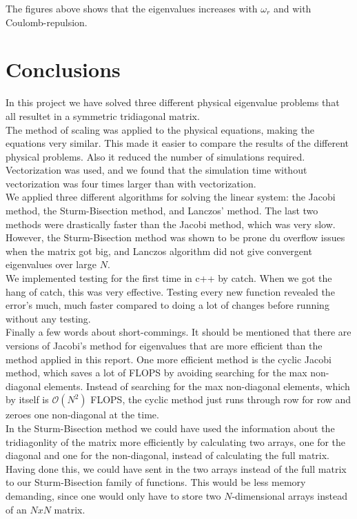 \documentclass{article}
\begin{document}
The figures above shows that the eigenvalues increases with $\omega_r$ and with Coulomb-repulsion.


\section{Conclusions}
In this project we have solved three different physical eigenvalue problems that all resultet in a symmetric tridiagonal matrix. \\

The method of scaling was applied to the physical equations, making the equations very similar. This made it easier to compare the results of the different physical problems. Also it reduced the number of simulations required. \\

Vectorization was used, and we found that the simulation time without vectorization was four times larger than with vectorization.\\

We applied three different algorithms for solving the linear system: the Jacobi method, the Sturm-Bisection method, and Lanczos' method. The last two methods were drastically faster than the Jacobi method, which was very slow. However, the Sturm-Bisection method was shown to be prone du overflow issues when the matrix got big, and Lanczos algorithm did not give convergent eigenvalues over large $N$. \\

We implemented testing for the first time in c++ by catch. When we got the hang of catch, this was very effective. Testing every new function revealed the error's much, much faster compared to doing a lot of changes before running without any testing.\\

Finally a few words about short-commings. It should be mentioned that there are versions of Jacobi's method for eigenvalues that are more efficient than the method applied in this report. One more efficient method is the cyclic Jacobi method, which saves a lot of FLOPS by avoiding searching for the max non-diagonal elements. Instead of searching for the max non-diagonal elements, which by itself is $\mathcal{O}(N^2)$ FLOPS, the cyclic method just runs through row for row and zeroes one non-diagonal at the time.\\

In the Sturm-Bisection method we could have used the information about the tridiagonlity of the matrix more efficiently by calculating two arrays, one for the diagonal and one for the non-diagonal, instead of calculating the full matrix. Having done this, we could have sent in the two arrays instead of the full matrix to our Sturm-Bisection family of functions. This would be less memory demanding, since one would only have to store two $N$-dimensional arrays instead of an $N x N$ matrix.\\
\end{document}
